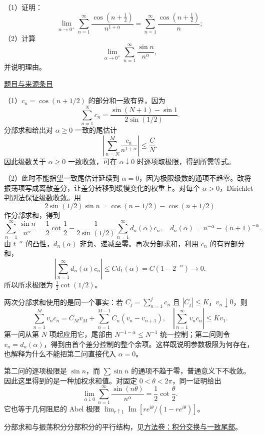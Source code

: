 \documentclass[12pt,fontset=fandol]{ctexart}
\begin{document}
\begin{example}[来源序号6]\label{ex:ch08-13th-A-makeup:6}\label{pr:ch08-13th-A-makeup:6}

（1）证明：
\[
\lim_{\alpha\to 0^{+}}\sum_{n=1}^{\infty}\frac{\cos\left(n+\frac{1}{2}\right)}{n^{1+\alpha}}=\sum_{n=1}^{\infty}\frac{\cos\left(n+\frac{1}{2}\right)}{n};
\]
（2）计算
\[
\lim_{\alpha\to 0^{+}}\sum_{n=1}^{\infty}\frac{\sin n}{n^{\alpha}},
\]
并说明理由。

\par\href{https://github.com/lzxcr/cmc-mathematics/blob/64916fa1fdbc3e444a652eca204d5669058ee321/src/problems/preliminary/13-makeup/06.md}{题目与来源条目}

\end{example}

\begin{solve}\label{ans:ch08-13th-A-makeup:6}

（1）$c_n=\cos(n+1/2)$ 的部分和一致有界，因为
\[
\sum_{n=1}^N c_n=\frac{\sin(N+1)-\sin1}{2\sin(1/2)}.
\]
分部求和给出对 $\alpha\geq0$ 一致的尾估计
\[
\left|\sum_{n=N}^M\frac{c_n}{n^{1+\alpha}}\right|\leq\frac C N.
\]
因此级数关于 $\alpha\geq0$ 一致收敛，可在 $\alpha\downarrow0$ 时逐项取极限，得到所需等式。

（2）此时不能指望一致尾估计延续到 $\alpha=0$，因为极限级数的通项不趋零。改将振荡项写成离散差分，让差分转移到缓慢变化的权重上。对每个 $\alpha>0$，Dirichlet 判别法保证级数收敛。用
\[
2\sin(1/2)\sin n=\cos(n-1/2)-\cos(n+1/2)
\]
作分部求和，得到
\[
\sum_{n=1}^\infty\frac{\sin n}{n^\alpha}
=\frac12\cot\frac12
-\frac1{2\sin(1/2)}\sum_{n=1}^\infty d_n(\alpha)c_n,
\quad d_n(\alpha)=n^{-\alpha}-(n+1)^{-\alpha}.
\]
由 $t^{-\alpha}$ 的凸性，$d_n(\alpha)$ 非负、递减至零。再次分部求和，利用 $c_n$ 的有界部分和，
\[
\left|\sum_{n=1}^\infty d_n(\alpha)c_n\right|
\leq C d_1(\alpha)=C(1-2^{-\alpha})\longrightarrow0.
\]
所以所求极限为 $\tfrac12\cot(1/2)$。

两次分部求和使用的是同一个事实：若 $C_j=\sum_{n=1}^jc_n$ 且 $|C_j|\le K$，$v_n\downarrow0$，则
\[
\sum_{n=1}^Mv_nc_n=C_Mv_M+\sum_{n=1}^{M-1}C_n(v_n-v_{n+1}),
\quad
\left|\sum_{n=1}^\infty v_nc_n\right|\le Kv_1.
\]
第一问从第 $N$ 项起应用它，尾部由 $N^{-1-\alpha}\le N^{-1}$ 统一控制；第二问则令 $v_n=d_n(\alpha)$，得到由首个差分控制的整个余项。这样既说明参数极限为何存在，也解释为什么不能把第二问直接代入 $\alpha=0$。

\end{solve}

\begin{remark}[方法与条件]第二问的逐项极限是 $\sin n$，而 $\sum\sin n$ 的通项不趋于零，普通意义下不收敛。因此这里得到的是一种加权求和值。对固定 $0<\theta<2\pi$，同一证明给出
\[
\lim_{\alpha\downarrow0}\sum_{n=1}^\infty
\frac{\sin(n\theta)}{n^\alpha}=\frac12\cot\frac\theta2.
\]
它也等于几何阻尼的 Abel 极限 $\lim_{r\uparrow1}\operatorname{Im}[re^{i\theta}/(1-re^{i\theta})]$。

分部求和与振荡积分分部积分的平行结构，见\hyperref[app:integration-exchange]{方法卷：积分交换与一致尾部}。\end{remark}
\end{document}
